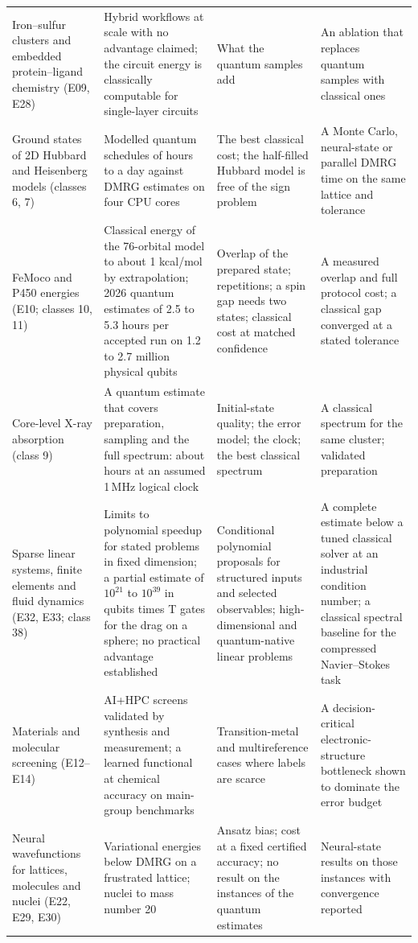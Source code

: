{\begin{longtable}{@{}L{3.0cm} L{4.7cm} L{4.1cm} L{4.1cm}@{}}
Iron--sulfur clusters and embedded protein--ligand chemistry (E09, E28) & Hybrid workflows at scale with no advantage claimed; the circuit energy is classically computable for single-layer circuits & What the quantum samples add & An ablation that replaces quantum samples with classical ones\\
Ground states of 2D Hubbard and Heisenberg models (classes 6, 7) & Modelled quantum schedules of hours to a day against DMRG estimates on four CPU cores & The best classical cost; the half-filled Hubbard model is free of the sign problem & A Monte Carlo, neural-state or parallel DMRG time on the same lattice and tolerance\\
FeMoco and P450 energies (E10; classes 10, 11) & Classical energy of the 76-orbital model to about 1 kcal/mol by extrapolation; 2026 quantum estimates of 2.5 to 5.3 hours per accepted run on 1.2 to 2.7 million physical qubits & Overlap of the prepared state; repetitions; a spin gap needs two states; classical cost at matched confidence & A measured overlap and full protocol cost; a classical gap converged at a stated tolerance\\
Core-level X-ray absorption (class 9) & A quantum estimate that covers preparation, sampling and the full spectrum: about \xasHours{} hours at an assumed 1\,MHz logical clock & Initial-state quality; the error model; the clock; the best classical spectrum & A classical spectrum for the same cluster; validated preparation\\
Sparse linear systems, finite elements and fluid dynamics (E32, E33; class 38) & Limits to polynomial speedup for stated problems in fixed dimension; a partial estimate of $10^{21}$ to $10^{39}$ in qubits times T gates for the drag on a sphere; no practical advantage established & Conditional polynomial proposals for structured inputs and selected observables; high-dimensional and quantum-native linear problems & A complete estimate below a tuned classical solver at an industrial condition number; a classical spectral baseline for the compressed Navier--Stokes task\\
Materials and molecular screening (E12--E14) & AI+HPC screens validated by synthesis and measurement; a learned functional at chemical accuracy on main-group benchmarks & Transition-metal and multireference cases where labels are scarce & A decision-critical electronic-structure bottleneck shown to dominate the error budget\\
Neural wavefunctions for lattices, molecules and nuclei (E22, E29, E30) & Variational energies below DMRG on a frustrated lattice; nuclei to mass number 20 & Ansatz bias; cost at a fixed certified accuracy; no result on the instances of the quantum estimates & Neural-state results on those instances with convergence reported\\
\end{longtable}
}

